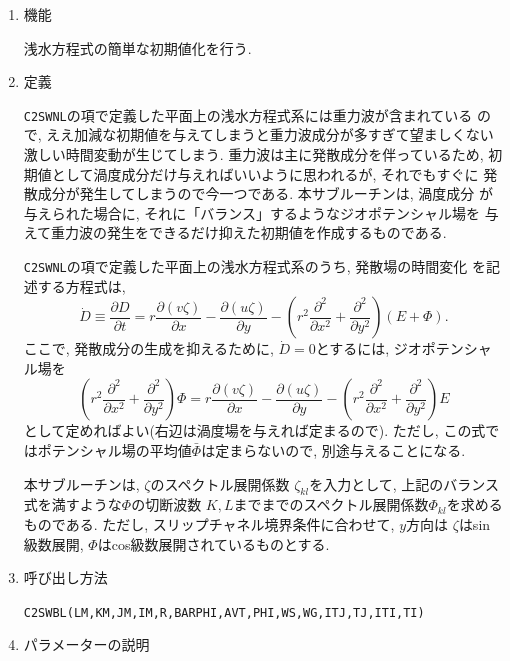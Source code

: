 \documentclass[a4j,fleqn]{jarticle}
\begin{document}
\begin{enumerate}

\item 機能 

浅水方程式の簡単な初期値化を行う.

\item 定義

{\tt C2SWNL}の項で定義した平面上の浅水方程式系には重力波が含まれている
ので, ええ加減な初期値を与えてしまうと重力波成分が多すぎて望ましくない
激しい時間変動が生じてしまう. 重力波は主に発散成分を伴っているため,
初期値として渦度成分だけ与えればいいように思われるが, それでもすぐに
発散成分が発生してしまうので今一つである. 本サブルーチンは, 渦度成分
が与えられた場合に, それに「バランス」するようなジオポテンシャル場を
与えて重力波の発生をできるだけ抑えた初期値を作成するものである.

{\tt C2SWNL}の項で定義した平面上の浅水方程式系のうち, 発散場の時間変化
を記述する方程式は,
\begin{equation}
\dot{D}\equiv\frac{\partial D}{\partial t}
=r\frac{\partial(v\zeta)}{\partial x}
-\frac{\partial(u\zeta)}{\partial y}
 -\left(r^2\frac{\partial^2}{\partial x^2}
  +\frac{\partial^2}{\partial y^2}\right)(E+\Phi).
\end{equation}
ここで, 発散成分の生成を抑えるために, $\dot D=0$とするには, 
ジオポテンシャル場を
\begin{equation}
\left(r^2\frac{\partial^2}{\partial x^2}
  +\frac{\partial^2}{\partial y^2}\right)\Phi
=r\frac{\partial(v\zeta)}{\partial x}
-\frac{\partial(u\zeta)}{\partial y}
 -\left(r^2\frac{\partial^2}{\partial x^2}
  +\frac{\partial^2}{\partial y^2}\right)E
\end{equation}
として定めればよい(右辺は渦度場を与えれば定まるので).
ただし, この式ではポテンシャル場の平均値$\bar\Phi$は定まらないので,
別途与えることになる.

本サブルーチンは, $\zeta$のスペクトル展開係数
$\zeta_{kl}$を入力として, 上記のバランス式を満すような$\Phi$の切断波数
$K,L$までまでのスペクトル展開係数$\Phi_{kl}$を求めるものである.
ただし, スリップチャネル境界条件に合わせて, $y$方向は
$\zeta$はsin級数展開, $\Phi$はcos級数展開されているものとする.

\item 呼び出し方法 

{\tt C2SWBL(LM,KM,JM,IM,R,BARPHI,AVT,PHI,WS,WG,ITJ,TJ,ITI,TI)}
  
\item パラメーターの説明


\end{enumerate}
\end{document}
